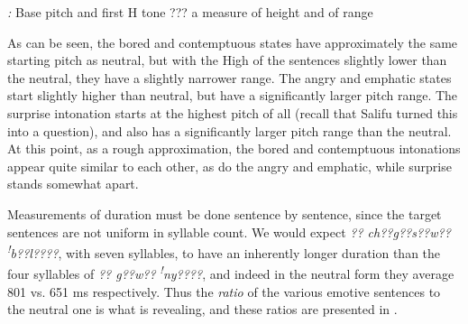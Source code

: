 \documentclass[output=paper]{langsci/langscibook}
\begin{document}







\emph{\textup{:}}\textit{ }Base pitch and first H tone ??? a measure of height and of range

As can be seen, the bored and contemptuous states have approximately the same starting pitch as neutral, but with the High of the sentences slightly lower than the neutral, they have a slightly narrower range.  The angry and emphatic states start slightly higher than neutral, but have a significantly larger pitch range.  The surprise intonation starts at the highest pitch of all (recall that Salifu turned this into a question), and also has a significantly larger pitch range than the neutral. At this point, as a rough approximation, the bored and contemptuous intonations appear quite similar to each other, as do the angry and emphatic, while surprise stands somewhat apart. 

Measurements of duration must be done sentence by sentence, since the target sentences are not uniform in syllable count. We would expect\textit{ ?? ch??g??s??w?? }\textit{\textsuperscript{!}}\textit{b??l????}, with seven syllables,\textit{ }to have an inherently longer duration than the four syllables of \textit{?? g??w?? }\textit{\textsuperscript{!}}\textit{ny????}, and indeed in the neutral form they average 801 vs. 651 ms respectively. Thus the \emph{ratio} of the various emotive sentences to the neutral one is what is revealing, and these ratios are presented in . 
\end{document}
